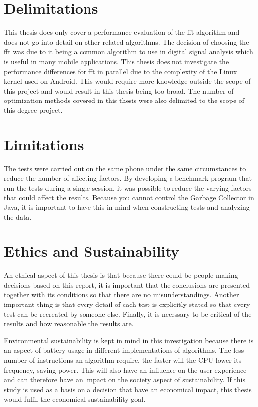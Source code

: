 \section{Delimitations}
This thesis does only cover a performance evaluation of the \gls{fft} algorithm and does not go into detail on other related algorithms. The decision of choosing the \gls{fft} was due to it being a common algorithm to use in digital signal analysis which is useful in many mobile applications. This thesis does not investigate the performance differences for \gls{fft} in parallel due to the complexity of the Linux kernel used on Android. This would require more knowledge outside the scope of this project and would result in this thesis being too broad. The number of optimization methods covered in this thesis were also delimited to the scope of this degree project.

\section{Limitations}
The tests were carried out on the same phone under the same circumstances to reduce the number of affecting factors. By developing a benchmark program that run the tests during a single session, it was possible to reduce the varying factors that could affect the results. Because you cannot control the Garbage Collector in Java, it is important to have this in mind when constructing tests and analyzing the data.

\section{Ethics and Sustainability}
An ethical aspect of this thesis is that because there could be people making decisions based on this report, it is important that the conclusions are presented together with its conditions so that there are no misunderstandings. Another important thing is that every detail of each test is explicitly stated so that every test can be recreated by someone else. Finally, it is necessary to be critical of the results and how reasonable the results are.

Environmental sustainability is kept in mind in this investigation because there is an aspect of battery usage in different implementations of algorithms. The less number of instructions an algorithm require, the faster will the CPU lower its frequency, saving power. This will also have an influence on the user experience and can therefore have an impact on the society aspect of sustainability. If this study is used as a basis on a decision that have an economical impact, this thesis would fulfil the economical sustainability goal.

